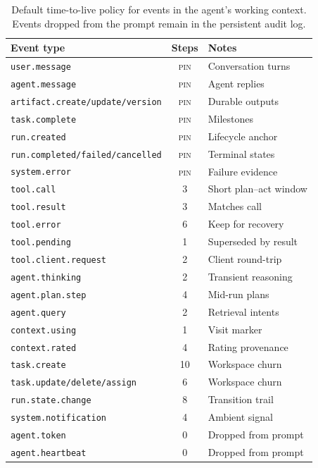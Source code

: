 \begin{table}[h]
    \centering
    \small
    \begin{tabular}{lcl}
        \toprule
        Event type & Steps & Notes \\
        \midrule
        \texttt{user.message}      & \textsc{pin} & Conversation turns \\
        \texttt{agent.message}     & \textsc{pin} & Agent replies \\
        \texttt{artifact.create/update/version} & \textsc{pin} & Durable outputs \\
        \texttt{task.complete}     & \textsc{pin} & Milestones \\
        \texttt{run.created}       & \textsc{pin} & Lifecycle anchor \\
        \texttt{run.completed/failed/cancelled} & \textsc{pin} & Terminal states \\
        \texttt{system.error}      & \textsc{pin} & Failure evidence \\
        \midrule
        \texttt{tool.call}         & 3 & Short plan--act window \\
        \texttt{tool.result}       & 3 & Matches call \\
        \texttt{tool.error}        & 6 & Keep for recovery \\
        \texttt{tool.pending}      & 1 & Superseded by result \\
        \texttt{tool.client.request} & 2 & Client round-trip \\
        \texttt{agent.thinking}    & 2 & Transient reasoning \\
        \texttt{agent.plan.step}   & 4 & Mid-run plans \\
        \texttt{agent.query}       & 2 & Retrieval intents \\
        \texttt{context.using}     & 1 & Visit marker \\
        \texttt{context.rated}     & 4 & Rating provenance \\
        \texttt{task.create}       & 10 & Workspace churn \\
        \texttt{task.update/delete/assign} & 6 & Workspace churn \\
        \texttt{run.state.change}  & 8 & Transition trail \\
        \texttt{system.notification} & 4 & Ambient signal \\
        \midrule
        \texttt{agent.token}       & 0 & Dropped from prompt \\
        \texttt{agent.heartbeat}   & 0 & Dropped from prompt \\
        \bottomrule
    \end{tabular}
    \caption{Default time-to-live policy for events in the agent's
    working context. Events dropped from the prompt remain in the
    persistent audit log.}
    \label{tab:ttl}
\end{table}

